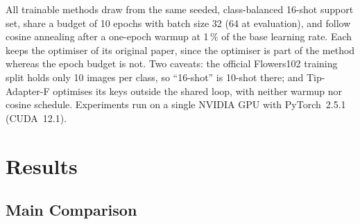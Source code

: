 \documentclass[10pt,twocolumn,letterpaper]{article}
\begin{document}
All trainable methods draw from the same seeded, class-balanced 16-shot
support set, share a budget of 10 epochs with batch size 32 (64 at
evaluation), and follow cosine annealing after a one-epoch warmup at 1\,\% of the base learning
rate.  Each keeps the optimiser of its original paper, since the optimiser
is part of the method whereas the epoch budget is not.  Two caveats: the
official Flowers102 training split holds only 10 images per class, so
``16-shot'' is 10-shot there; and Tip-Adapter-F optimises its keys outside
the shared loop, with neither warmup nor cosine schedule.  Experiments run
on a single NVIDIA GPU with PyTorch~2.5.1 (CUDA~12.1).


\section{Results}\label{sec:results}

\subsection{Main Comparison}\label{sec:main-results}
\end{document}
